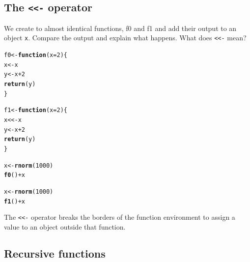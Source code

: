\documentclass[12pt,a4paper]{scrartcl}\usepackage[]{graphicx}\usepackage[]{color}
\makeatletter
\newcommand{\hlnum}[1]{\textcolor[rgb]{0.686,0.059,0.569}{#1}}%
\newcommand{\hlopt}[1]{\textcolor[rgb]{0,0,0}{#1}}%
\newcommand{\hlstd}[1]{\textcolor[rgb]{0.345,0.345,0.345}{#1}}%
\newcommand{\hlkwa}[1]{\textcolor[rgb]{0.161,0.373,0.58}{\textbf{#1}}}%
\newcommand{\hlkwb}[1]{\textcolor[rgb]{0.69,0.353,0.396}{#1}}%
\newcommand{\hlkwc}[1]{\textcolor[rgb]{0.333,0.667,0.333}{#1}}%
\newcommand{\hlkwd}[1]{\textcolor[rgb]{0.737,0.353,0.396}{\textbf{#1}}}%
\newenvironment{kframe}{%
 \def\at@end@of@kframe{}%
 \ifinner\ifhmode%
  \def\at@end@of@kframe{\end{minipage}}%
  \begin{minipage}{\columnwidth}%
 \fi\fi%
 \def\FrameCommand##1{\hskip\@totalleftmargin \hskip-\fboxsep
 \colorbox{shadecolor}{##1}\hskip-\fboxsep
     \hskip-\linewidth \hskip-\@totalleftmargin \hskip\columnwidth}%
 \MakeFramed {\advance\hsize-\width
   \@totalleftmargin\z@ \linewidth\hsize
   \@setminipage}}%
 {\par\unskip\endMakeFramed%
 \at@end@of@kframe}
\newenvironment{knitrout}{}{} %
\makeatother
\begin{document}
\subsection{The \texttt{<<-} operator}

\begin{Exercise}[difficulty=1, title={Understand the \texttt{<<-}}]
We create to almost identical functions, f0 and f1 and add their output to an object \texttt{x}. Compare the output and explain what happens. What does \texttt{<<-} mean?

\begin{knitrout}
\color{fgcolor}\begin{kframe}
\begin{alltt}
\hlstd{f0} \hlkwb{<-} \hlkwa{function}\hlstd{(}\hlkwc{x}\hlstd{=}\hlnum{2}\hlstd{)\{}
  \hlstd{x} \hlkwb{<-} \hlstd{x}
  \hlstd{y} \hlkwb{<-} \hlstd{x}\hlopt{+}\hlnum{2}
  \hlkwd{return}\hlstd{(y)}
\hlstd{\}}

\hlstd{f1} \hlkwb{<-} \hlkwa{function}\hlstd{(}\hlkwc{x}\hlstd{=}\hlnum{2}\hlstd{)\{}
  \hlstd{x} \hlkwb{<<-} \hlstd{x}
  \hlstd{y} \hlkwb{<-} \hlstd{x}\hlopt{+}\hlnum{2}
  \hlkwd{return}\hlstd{(y)}
\hlstd{\}}

\hlstd{x} \hlkwb{<-} \hlkwd{rnorm}\hlstd{(}\hlnum{1000}\hlstd{)}
\hlkwd{f0}\hlstd{()}\hlopt{+}\hlstd{x}

\hlstd{x} \hlkwb{<-} \hlkwd{rnorm}\hlstd{(}\hlnum{1000}\hlstd{)}
\hlkwd{f1}\hlstd{()}\hlopt{+}\hlstd{x}
\end{alltt}
\end{kframe}
\end{knitrout}

\end{Exercise}

\begin{Answer}
The \texttt{<<-} operator breaks the borders of the function environment to assign a value to an object outside that function.
\end{Answer}


\subsection{Recursive functions}
\end{document}
